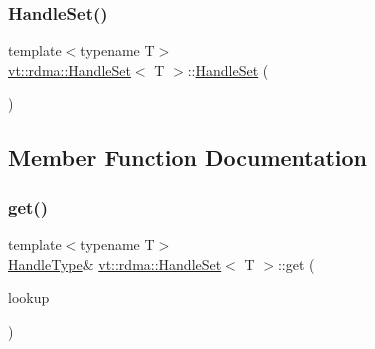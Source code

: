 \mbox{\label{structvt_1_1rdma_1_1_handle_set_ac64a7c08446a8054ae533630dab04672}} 
\subsubsection{\texorpdfstring{Handle\+Set()}{HandleSet()}\hspace{0.1cm}{\footnotesize\ttfamily [3/3]}}
{\footnotesize\ttfamily template$<$typename T$>$ \\
\hyperlink{structvt_1_1rdma_1_1_handle_set}{vt\+::rdma\+::\+Handle\+Set}$<$ T $>$\+::\hyperlink{structvt_1_1rdma_1_1_handle_set}{Handle\+Set} (\begin{DoxyParamCaption}\item[{\hyperlink{structvt_1_1rdma_1_1_handle_set}{Handle\+Set}$<$ T $>$ \&\&}]{ }\end{DoxyParamCaption})\hspace{0.3cm}{\ttfamily [default]}}



\subsection{Member Function Documentation}
\mbox{\label{structvt_1_1rdma_1_1_handle_set_a7142722ee5cb3dfaece2f4296d8fcf8d}} 
\subsubsection{\texorpdfstring{get()}{get()}}
{\footnotesize\ttfamily template$<$typename T$>$ \\
\hyperlink{structvt_1_1rdma_1_1_handle_set_ab3a698ee86bae503dfa84617205b2dd9}{Handle\+Type}\& \hyperlink{structvt_1_1rdma_1_1_handle_set}{vt\+::rdma\+::\+Handle\+Set}$<$ T $>$\+::get (\begin{DoxyParamCaption}\item[{\hyperlink{structvt_1_1rdma_1_1_handle_set_a81d333ec397f0becb9fe692e53145441}{Lookup\+Type}}]{lookup }\end{DoxyParamCaption})\hspace{0.3cm}{\ttfamily [inline]}}



